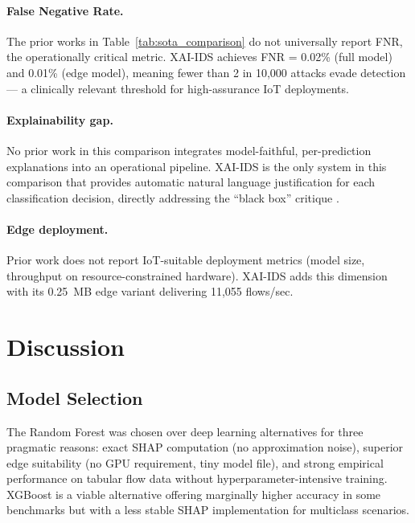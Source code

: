 \documentclass[12pt,a4paper]{article}
\begin{document}
\paragraph{False Negative Rate.}
The prior works in Table~\ref{tab:sota_comparison} do not universally report FNR,
the operationally critical metric. XAI-IDS achieves FNR = 0.02\% (full model)
and 0.01\% (edge model), meaning fewer than 2 in 10,000 attacks evade detection
— a clinically relevant threshold for high-assurance IoT deployments.

\paragraph{Explainability gap.}
No prior work in this comparison integrates model-faithful, per-prediction
explanations into an operational pipeline. XAI-IDS is the only system in this
comparison that provides automatic natural language justification for each
classification decision, directly addressing the ``black box'' critique
\cite{doshi2017towards, gunning2019xai}.

\paragraph{Edge deployment.}
Prior work does not report IoT-suitable deployment metrics (model size, throughput
on resource-constrained hardware). XAI-IDS adds this dimension with its 0.25~MB
edge variant delivering 11,055 flows/sec.

\section{Discussion}
\label{sec:discussion}

\subsection{Model Selection}

The Random Forest was chosen over deep learning alternatives for three pragmatic
reasons: exact SHAP computation (no approximation noise), superior edge suitability
(no GPU requirement, tiny model file), and strong empirical performance on tabular
flow data without hyperparameter-intensive training. XGBoost \cite{chen2016xgboost}
is a viable alternative offering marginally higher accuracy in some benchmarks but
with a less stable SHAP implementation for multiclass scenarios.
\end{document}

